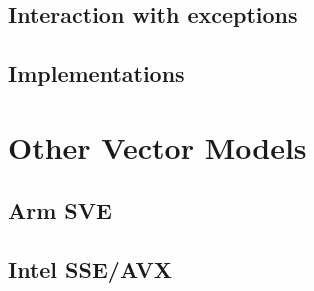 \subsection{Interaction with exceptions}

\subsection{Implementations}

\section{Other Vector Models}
\subsection{Arm SVE}
\subsection{Intel SSE/AVX}